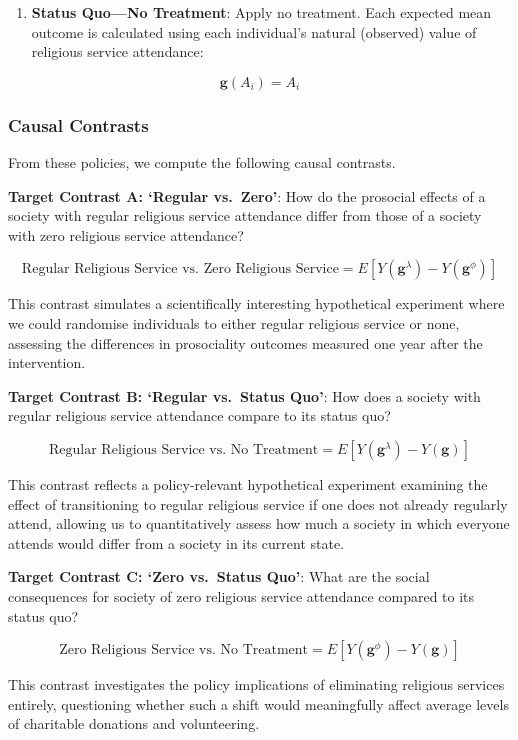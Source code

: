 \documentclass[
  single column]{article}
\providecommand{\tightlist}{%
  \setlength{\itemsep}{0pt}\setlength{\parskip}{0pt}}\usepackage{longtable,booktabs,array}
\begin{document}
\begin{enumerate}
\def\labelenumi{\arabic{enumi}.}
\setcounter{enumi}{2}
\tightlist
\item
  \textbf{Status Quo---No Treatment}: Apply no treatment. Each expected
  mean outcome is calculated using each individual's natural (observed)
  value of religious service attendance:
\end{enumerate}

\[
\mathbf{g}(A_i) = A_i
\]

\subsubsection{Causal Contrasts}\label{causal-contrasts}

From these policies, we compute the following causal contrasts.

\textbf{Target Contrast A: `Regular vs.~Zero'}: How do the prosocial
effects of a society with regular religious service attendance differ
from those of a society with zero religious service attendance?

\[ 
\text{Regular Religious Service vs. Zero Religious Service} = E[Y(\mathbf{g}^\lambda) - Y(\mathbf{g}^\phi)] 
\]

This contrast simulates a scientifically interesting hypothetical
experiment where we could randomise individuals to either regular
religious service or none, assessing the differences in prosociality
outcomes measured one year after the intervention.

\textbf{Target Contrast B: `Regular vs.~Status Quo'}: How does a society
with regular religious service attendance compare to its status quo?

\[ 
\text{Regular Religious Service vs. No Treatment} = E[Y(\mathbf{g}^\lambda) - Y(\mathbf{g})] 
\]

This contrast reflects a policy-relevant hypothetical experiment
examining the effect of transitioning to regular religious service if
one does not already regularly attend, allowing us to quantitatively
assess how much a society in which everyone attends would differ from a
society in its current state.

\textbf{Target Contrast C: `Zero vs.~Status Quo'}: What are the social
consequences for society of zero religious service attendance compared
to its status quo?

\[ 
\text{Zero Religious Service vs. No Treatment} = E[Y(\mathbf{g}^\phi) - Y(\mathbf{g})] 
\]

This contrast investigates the policy implications of eliminating
religious services entirely, questioning whether such a shift would
meaningfully affect average levels of charitable donations and
volunteering.
\end{document}
